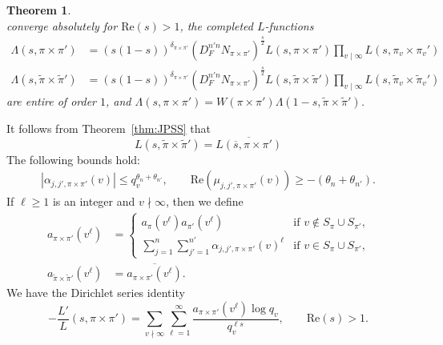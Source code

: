\documentclass[11pt]{amsart}
\newtheorem{theorem}{Theorem}[section]
\theoremstyle{remark}
\numberwithin{equation}{section}
\begin{document}
\begin{theorem}
\[\]
converge absolutely for $\mathrm{Re}(s)>1$, the completed $L$-functions
\begin{align*}
\Lambda(s,\pi\times\pi') &= (s(1-s))^{\delta_{\pi\times\pi'}} (D_F^{n'n}N_{\pi\times\pi'})^{\frac{s}{2}} L(s,\pi\times\pi')\prod_{v\mid\infty}L(s,\pi_v\times\pi_{v}')\\
\Lambda(s,\widetilde{\pi}\times\widetilde{\pi}') &= (s(1-s))^{\delta_{\pi\times\pi'}} (D_F^{n'n}N_{\pi\times\pi'})^{\frac{s}{2}}L(s,\widetilde{\pi}\times\widetilde{\pi}')\prod_{v\mid\infty}L(s,\widetilde{\pi}_{v}\times\widetilde{\pi}_{v}')
\end{align*}
are entire of order $1$, and $\Lambda(s,\pi\times\pi')=W(\pi\times\pi')\Lambda(1-s,\widetilde{\pi}\times\widetilde{\pi}')$.
\end{theorem}

It follows from Theorem~\ref{thm:JPSS} that
\begin{equation}
	\label{eqn:dual}
	L(s,\widetilde{\pi}\times\widetilde{\pi}')=\overline{L(\overline{s},\pi\times\pi')}
	\end{equation}
The following bounds hold:
	\begin{equation}
		\label{eqn:Ramanujan2}
		\begin{aligned}
	|\alpha_{j,j',\pi\times\pi'}(v)|\leq  q_v^{\theta_n+\theta_{n'}},\qquad \mathrm{Re}(\mu_{j,j',\pi\times\pi'}(v))\geq -(\theta_n+\theta_{n'}).
	\end{aligned}
	\end{equation}
	If $\ell\geq 1$ is an integer and $v\nmid\infty$, then we define
	\begin{equation}
	\label{eqn:a_def}
	\begin{aligned}
	a_{\pi\times\pi'}(v^{\ell})&= \begin{cases}
 	a_{\pi}(v^{\ell})a_{\pi'}(v^{\ell})&\mbox{if $v\notin S_{\pi}\cup S_{\pi'}$,}\\
 	\sum_{j=1}^n \sum_{j'=1}^{n'}\alpha_{j,j',\pi\times\pi'}(v)^{\ell}&\mbox{if $v\in S_{\pi}\cup S_{\pi'}$,}
 \end{cases}\\
 a_{\widetilde{\pi}\times\widetilde{\pi}'}(v^{\ell})&=\overline{a_{\pi\times\pi'}(v^{\ell})}.
 \end{aligned}
	\end{equation}
	We have the Dirichlet series identity
	\begin{equation}
		\label{eqn:log_deriv}
	-\frac{L'}{L}(s,\pi\times\pi')=\sum_{v\nmid\infty}\sum_{\ell=1}^{\infty}\frac{a_{\pi\times\pi'}(v^{\ell})\log q_v}{q_v^{\ell s}},\qquad\mathrm{Re}(s)>1.
	\end{equation}
	
\end{document}
